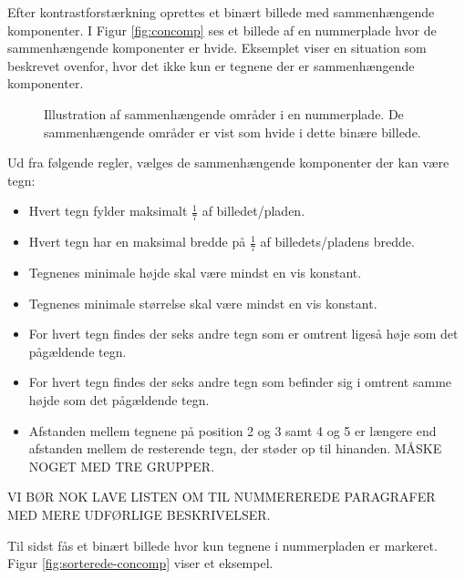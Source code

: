 Efter kontrastforstærkning oprettes et binært billede med sammenhængende komponenter. I Figur \vref{fig:concomp} ses et billede af en nummerplade hvor de sammenhængende komponenter er hvide. Eksemplet viser en situation som beskrevet ovenfor, hvor det ikke kun er tegnene der er sammenhængende komponenter.

\begin{figure}[htp]
  \centering
  \caption{Illustration af sammenhængende områder i en nummerplade. De sammenhængende områder er vist som hvide i dette binære billede.}
  \label{fig:concomp}
\end{figure}

Ud fra følgende regler, vælges de sammenhængende komponenter der kan være tegn:

\begin{itemize}
\item Hvert tegn fylder maksimalt $\frac{1}{7}$ af billedet/pladen.
\item Hvert tegn har en maksimal bredde på $\frac{1}{7}$ af billedets/pladens bredde.
\item Tegnenes minimale højde skal være mindst en vis konstant.%
\item Tegnenes minimale størrelse skal være mindst en vis konstant.%
\item For hvert tegn findes der seks andre tegn som er omtrent ligeså høje som det pågældende tegn.
\item For hvert tegn findes der seks andre tegn som befinder sig i omtrent samme højde som det pågældende tegn.
\item Afstanden mellem tegnene på position 2 og 3 samt 4 og 5 er længere end afstanden mellem de resterende tegn, der støder op til hinanden. MÅSKE NOGET MED TRE GRUPPER.
\end{itemize}
VI BØR NOK LAVE LISTEN OM TIL NUMMEREREDE PARAGRAFER MED MERE UDFØRLIGE BESKRIVELSER.


Til sidst fås et binært billede hvor kun tegnene i nummerpladen er markeret. Figur \vref{fig:sorterede-concomp} viser et eksempel.


